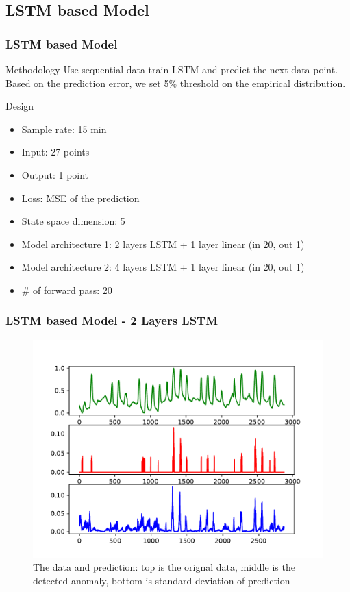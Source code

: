 \documentclass{beamer}
\begin{document}
\subsection{LSTM based Model}
\begin{frame}
\frametitle{LSTM based Model}

\begin{block}{Methodology}
Use sequential data train LSTM and predict the next data point. Based on the prediction error, we set 5\% threshold on the empirical distribution.
\end{block}

\begin{block}{Design}
\begin{itemize}
\setlength\itemsep{0em}
\item Sample rate: 15 min
\item Input: 27 points
\item Output: 1 point
\item Loss: MSE of the prediction 
\item State space dimension: 5
\item Model architecture 1: 2 layers LSTM + 1 layer linear (in 20, out 1)
\item Model architecture 2: 4 layers LSTM + 1 layer linear (in 20, out 1)
\item \# of forward pass: 20
\end{itemize}
\end{block}

\end{frame}

\begin{frame}
\frametitle{LSTM based Model - 2 Layers LSTM}
\begin{figure}
\includegraphics[width=0.8\linewidth]{figs/lstm_dropout_test_h5_detect_2layer.pdf}
\vspace{-0.3in}
\caption{The data and prediction: top is the orignal data, middle is the detected anomaly, bottom is standard deviation of prediction}
\end{figure}
\end{frame}
\end{document}
